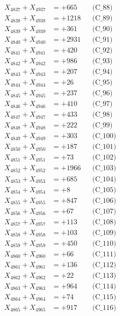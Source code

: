\documentclass[a4paper,10pt]{article}
\begin{document}
{\begin{align}
X_{4837} + X_{4937} &= +665 && \text{(C\_88)} \\
X_{4838} + X_{4938} &= +1218 && \text{(C\_89)} \\
X_{4839} + X_{4939} &= +361 && \text{(C\_90)} \\
\allowbreak
X_{4840} + X_{4940} &= +2931 && \text{(C\_91)} \\
X_{4841} + X_{4941} &= +420 && \text{(C\_92)} \\
X_{4842} + X_{4942} &= +986 && \text{(C\_93)} \\
X_{4843} + X_{4943} &= +207 && \text{(C\_94)} \\
X_{4844} + X_{4944} &= +26 && \text{(C\_95)} \\
\allowbreak
X_{4845} + X_{4945} &= +237 && \text{(C\_96)} \\
X_{4846} + X_{4946} &= +410 && \text{(C\_97)} \\
X_{4847} + X_{4947} &= +433 && \text{(C\_98)} \\
X_{4848} + X_{4948} &= +222 && \text{(C\_99)} \\
X_{4849} + X_{4949} &= +303 && \text{(C\_100)} \\
\allowbreak
X_{4850} + X_{4950} &= +187 && \text{(C\_101)} \\
X_{4851} + X_{4951} &= +73 && \text{(C\_102)} \\
X_{4852} + X_{4952} &= +1966 && \text{(C\_103)} \\
X_{4853} + X_{4953} &= +685 && \text{(C\_104)} \\
X_{4854} + X_{4954} &= +8 && \text{(C\_105)} \\
\allowbreak
X_{4855} + X_{4955} &= +847 && \text{(C\_106)} \\
X_{4856} + X_{4956} &= +67 && \text{(C\_107)} \\
X_{4857} + X_{4957} &= +113 && \text{(C\_108)} \\
X_{4858} + X_{4958} &= +103 && \text{(C\_109)} \\
X_{4859} + X_{4959} &= +450 && \text{(C\_110)} \\
\allowbreak
X_{4860} + X_{4960} &= +66 && \text{(C\_111)} \\
X_{4861} + X_{4961} &= +136 && \text{(C\_112)} \\
X_{4862} + X_{4962} &= +22 && \text{(C\_113)} \\
X_{4863} + X_{4963} &= +964 && \text{(C\_114)} \\
X_{4864} + X_{4964} &= +74 && \text{(C\_115)} \\
\allowbreak
X_{4865} + X_{4965} &= +917 && \text{(C\_116)} \\

\end{align}}
\end{document}

